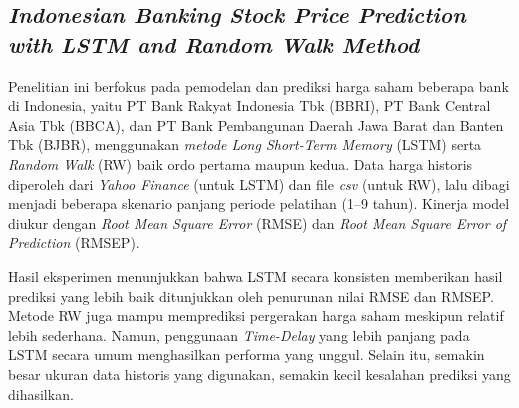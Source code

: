 \subsection{\textit{Indonesian Banking Stock Price Prediction with LSTM and Random Walk Method} \parencite{9609752}}

Penelitian ini berfokus pada pemodelan dan prediksi harga saham beberapa bank di Indonesia, yaitu PT Bank Rakyat Indonesia Tbk (BBRI), PT Bank Central Asia Tbk (BBCA), dan PT Bank Pembangunan Daerah Jawa Barat dan Banten Tbk (BJBR), menggunakan \textit{metode Long Short-Term Memory} (LSTM) serta \textit{Random Walk} (RW) baik ordo pertama maupun kedua. Data harga historis diperoleh dari \textit{Yahoo Finance} (untuk LSTM) dan file \textit{csv} (untuk RW), lalu dibagi menjadi beberapa skenario panjang periode pelatihan (1--9 tahun). Kinerja model diukur dengan \textit{Root Mean Square Error} (RMSE) dan \textit{Root Mean Square Error of Prediction} (RMSEP).

Hasil eksperimen menunjukkan bahwa LSTM secara konsisten memberikan hasil prediksi yang lebih baik ditunjukkan oleh penurunan nilai RMSE dan RMSEP. Metode RW juga mampu memprediksi pergerakan harga saham meskipun relatif lebih sederhana. Namun, penggunaan \textit{Time-Delay} yang lebih panjang pada LSTM secara umum menghasilkan performa yang unggul. Selain itu, semakin besar ukuran data historis yang digunakan, semakin kecil kesalahan prediksi yang dihasilkan. 





